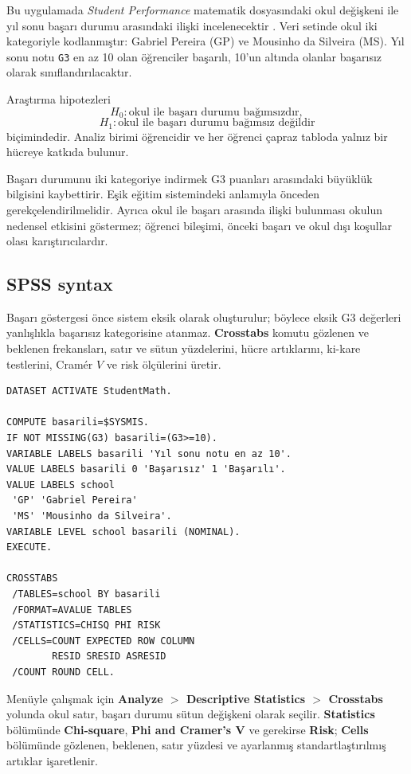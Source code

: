 Bu uygulamada \emph{Student Performance} matematik dosyasındaki okul
değişkeni ile yıl sonu başarı durumu arasındaki ilişki incelenecektir
\cite{cortez2008data,cortezsilva2008}. Veri setinde okul iki kategoriyle
kodlanmıştır: Gabriel Pereira (GP) ve Mousinho da Silveira (MS). Yıl sonu
notu \texttt{G3} en az 10 olan öğrenciler başarılı, 10'un altında olanlar
başarısız olarak sınıflandırılacaktır.

Araştırma hipotezleri
\[
H_0:\text{okul ile başarı durumu bağımsızdır},
\]
\[
H_1:\text{okul ile başarı durumu bağımsız değildir}
\]
biçimindedir. Analiz birimi öğrencidir ve her öğrenci çapraz tabloda yalnız
bir hücreye katkıda bulunur.

\begin{researchbox}
Başarı durumunu iki kategoriye indirmek G3 puanları arasındaki büyüklük
bilgisini kaybettirir. Eşik eğitim sistemindeki anlamıyla önceden
gerekçelendirilmelidir. Ayrıca okul ile başarı arasında ilişki bulunması okulun
nedensel etkisini göstermez; öğrenci bileşimi, önceki başarı ve okul dışı
koşullar olası karıştırıcılardır.
\end{researchbox}

\subsection{SPSS syntax}

Başarı göstergesi önce sistem eksik olarak oluşturulur; böylece eksik G3
değerleri yanlışlıkla başarısız kategorisine atanmaz. \textbf{Crosstabs}
komutu gözlenen ve beklenen frekansları, satır ve sütun yüzdelerini, hücre
artıklarını, ki-kare testlerini, Cramér $V$ ve risk ölçülerini üretir.

\begin{lstlisting}[language={}]
DATASET ACTIVATE StudentMath.

COMPUTE basarili=$SYSMIS.
IF NOT MISSING(G3) basarili=(G3>=10).
VARIABLE LABELS basarili 'Yıl sonu notu en az 10'.
VALUE LABELS basarili 0 'Başarısız' 1 'Başarılı'.
VALUE LABELS school
 'GP' 'Gabriel Pereira'
 'MS' 'Mousinho da Silveira'.
VARIABLE LEVEL school basarili (NOMINAL).
EXECUTE.

CROSSTABS
 /TABLES=school BY basarili
 /FORMAT=AVALUE TABLES
 /STATISTICS=CHISQ PHI RISK
 /CELLS=COUNT EXPECTED ROW COLUMN
        RESID SRESID ASRESID
 /COUNT ROUND CELL.
\end{lstlisting}

Menüyle çalışmak için \textbf{Analyze $>$ Descriptive Statistics $>$
Crosstabs} yolunda okul satır, başarı durumu sütun değişkeni olarak seçilir.
\textbf{Statistics} bölümünde \textbf{Chi-square}, \textbf{Phi and Cramer's
V} ve gerekirse \textbf{Risk}; \textbf{Cells} bölümünde gözlenen, beklenen,
satır yüzdesi ve ayarlanmış standartlaştırılmış artıklar işaretlenir.

